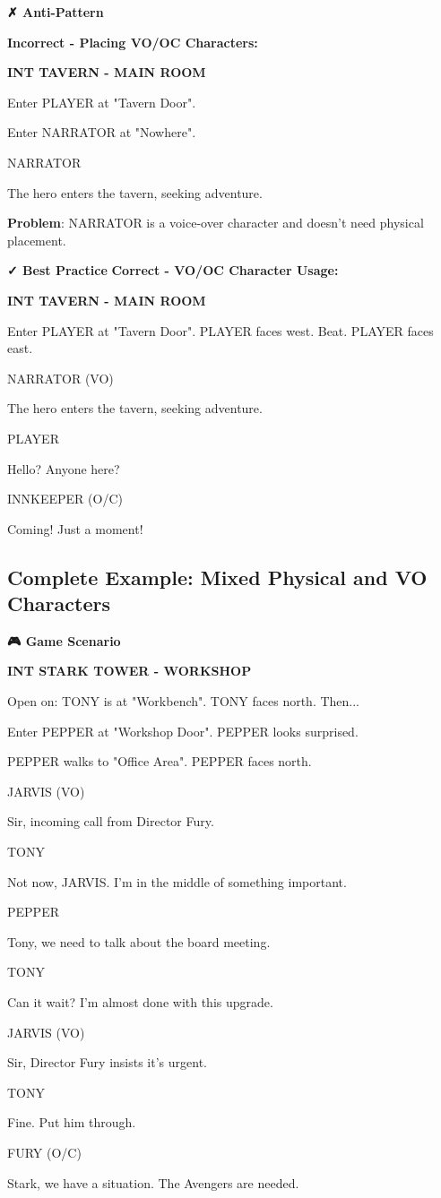 \documentclass[11pt,letterpaper,oldstylefigures]{memoir}
\newcommand{\slugline}[1]{\nobreak\textbf{\MakeUppercase{#1}}\par\nobreak\vspace{1\baselineskip}}
\newcommand{\speaker}[1]{\nobreak\hspace*{0.333\textwidth}\MakeUppercase{#1}\par\nobreak\vspace{0.5\baselineskip}}
\newcommand{\dialogue}[1]{\nobreak\hspace*{0.25\textwidth}\begin{minipage}{0.5\textwidth}#1\end{minipage}\par\vspace{1\baselineskip}}
\newcommand{\stagedir}[1]{#1\par\vspace{1\baselineskip}}
\newenvironment{FountainExample}
  {\begingroup
  \ttfamily\small
   \setlength{\parindent}{0pt}
  \setlength{\parskip}{0.5em}
  \allowdisplaybreaks
  \setlength{\displaywidowpenalty}{0}
  \setlength{\widowpenalty}{0}
  \setlength{\clubpenalty}{0}
  \setlength{\interlinepenalty}{0}
}
  {\endgroup}
\newenvironment{AntiPattern}
{\begingroup
\small
\setlength{\parindent}{0pt}
\setlength{\parskip}{0.5em}
\allowdisplaybreaks
\setlength{\displaywidowpenalty}{0}
\setlength{\widowpenalty}{0}
\setlength{\clubpenalty}{0}
\setlength{\interlinepenalty}{0}
\begin{tcolorbox}[
    colback=red!5,
    colframe=red!75!black,
    boxrule=0.5pt,
    arc=2pt,
    left=0.5em,
    right=0.5em,
    top=0.25em,
    bottom=0.25em
]
\textbf{✗ Anti-Pattern}
\end{tcolorbox}\par
}
{\endgroup}
\newenvironment{GameScenario}
{\begingroup
\small
\setlength{\parindent}{0pt}
\setlength{\parskip}{0.5em}
\allowdisplaybreaks
\setlength{\displaywidowpenalty}{0}
\setlength{\widowpenalty}{0}
\setlength{\clubpenalty}{0}
\setlength{\interlinepenalty}{0}
\begin{tcolorbox}[
    colback=orange!5,
    colframe=orange!75!black,
    boxrule=0.5pt,
    arc=2pt,
    left=0.5em,
    right=0.5em,
    top=0.25em,
    bottom=0.25em
]
\textbf{🎮 Game Scenario}
\end{tcolorbox}\par
}
{\endgroup}
\begin{document}
\begin{AntiPattern}
\textbf{Incorrect - Placing VO/OC Characters:}
\begin{FountainExample}
\slugline{INT TAVERN - MAIN ROOM}

\stagedir{Enter PLAYER at "Tavern Door".}
\stagedir{Enter NARRATOR at "Nowhere".}

\speaker{NARRATOR}
\dialogue{The hero enters the tavern, seeking adventure.}
\end{FountainExample}

\textbf{Problem}: NARRATOR is a voice-over character and doesn't need physical placement.
\end{AntiPattern}

\textbf{✓ Best Practice}
\textbf{Correct - VO/OC Character Usage:}
\begin{FountainExample}
\slugline{INT TAVERN - MAIN ROOM}

\stagedir{Enter PLAYER at "Tavern Door". PLAYER faces west. Beat. PLAYER faces east.}

\speaker{NARRATOR (VO)}
\dialogue{The hero enters the tavern, seeking adventure.}

\speaker{PLAYER}
\dialogue{Hello? Anyone here?}

\speaker{INNKEEPER (O/C)}
\dialogue{Coming! Just a moment!}
\end{FountainExample}


\subsection{Complete Example: Mixed Physical and VO Characters}

\begin{GameScenario}
\begin{FountainExample}
\slugline{INT STARK TOWER - WORKSHOP}

\stagedir{Open on: TONY is at "Workbench". TONY faces north. Then...}
\stagedir{Enter PEPPER at "Workshop Door". PEPPER looks surprised.}
\stagedir{PEPPER walks to "Office Area". PEPPER faces north.}

\speaker{JARVIS (VO)}
\dialogue{Sir, incoming call from Director Fury.}

\speaker{TONY}
\dialogue{Not now, JARVIS. I'm in the middle of something important.}

\speaker{PEPPER}
\dialogue{Tony, we need to talk about the board meeting.}

\speaker{TONY}
\dialogue{Can it wait? I'm almost done with this upgrade.}
\speaker{JARVIS (VO)}
\dialogue{Sir, Director Fury insists it's urgent.}
\speaker{TONY}
\dialogue{Fine. Put him through.}

\speaker{FURY (O/C)}
\dialogue{Stark, we have a situation. The Avengers are needed.}
\end{FountainExample}
\end{GameScenario}
\end{document}
